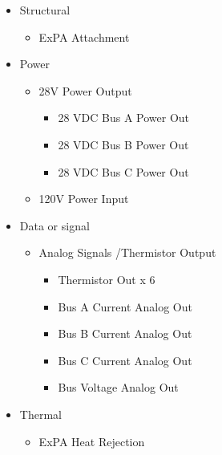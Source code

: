 \documentclass[12pt,oneside,oldfontcommands]{memoir}
\begin{document}
\begin{itemize}
\item{} Structural

\begin{itemize}
\item{} \gls{ExPA} Attachment

\end{itemize}

\item{} Power

\begin{itemize}
\item{} 28V Power Output

\begin{itemize}
\item{} 28 \gls{VDC} Bus A Power Out

\item{} 28 \gls{VDC} Bus B Power Out

\item{} 28 \gls{VDC} Bus C Power Out

\end{itemize}

\item{} 120V Power Input

\end{itemize}

\item{} Data or signal

\begin{itemize}
\item{} Analog Signals \slash  Thermistor Output

\begin{itemize}
\item{} Thermistor Out x 6

\item{} Bus A Current Analog Out

\item{} Bus B Current Analog Out

\item{} Bus C Current Analog Out

\item{} Bus Voltage Analog Out

\end{itemize}

\end{itemize}

\item{} Thermal

\begin{itemize}
\item{} \gls{ExPA} Heat Rejection


\end{itemize}
\end{itemize}
\end{document}
